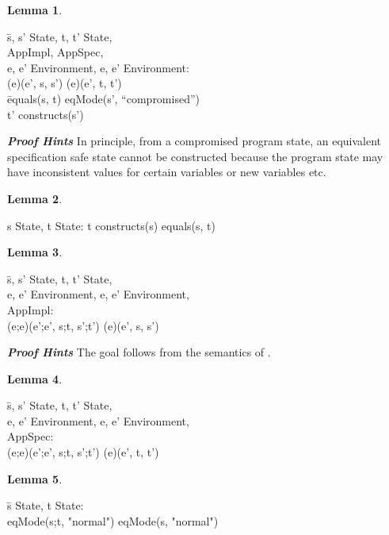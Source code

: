 \documentclass[conference]{IEEEtran}
\newtheorem{lem}{Lemma}
\begin{document}
\begin{lem}  \end{lem}\begin{tabbing} \=s, s'  State, t, t'  State, 
\\\>  AppImpl,   AppSpec, 
\\\>e, e'  Environment, e, e'  Environment:
\\\>\textlbrackdbl \textrbrackdbl(e)(e', s, s')  \textlbrackdbl \textrbrackdbl(e)(e', t, t') 
\\\> \=equals(s, t)  eqMode(s', ``compromised'') 
\\\>\> t'  constructs(s')
 \end{tabbing}
\textbf{\em Proof Hints}
In principle, from a compromised program state, an equivalent specification safe state cannot be constructed because the program state may have inconsistent values for certain variables or new variables etc.
 \begin{lem} \end{lem}\begin{tabbing} s  State, t  State: t  constructs(s)   equals(s, t)\end{tabbing}
\begin{lem} \end{lem} \begin{tabbing}  \=s, s'  State, t, t'  State, 
\\\>e, e'  Environment, e, e'  Environment, 
\\\>   AppImpl:
\\\>\textlbrackdbl \textrbrackdbl(e;e)(e';e', s;t, s';t')  \textlbrackdbl \textrbrackdbl(e)(e', s, s')
\end{tabbing}
\textbf{\em Proof Hints}
The goal follows from the semantics of \emph{}.
\begin{lem} \end{lem}\begin{tabbing}  \=s, s'  State, t, t'  State, 
\\\>e, e'  Environment, e, e'  Environment, 
\\\>   AppSpec: 
\\\>\textlbrackdbl \textrbrackdbl(e;e)(e';e', s;t, s';t')  \textlbrackdbl \textrbrackdbl(e)(e', t, t')
\end{tabbing}
\begin{lem} \end{lem} \begin{tabbing}  \=s  State, t  State: \\\>eqMode(s;t, "normal")  eqMode(s, "normal")
\end{tabbing}
\end{document}
